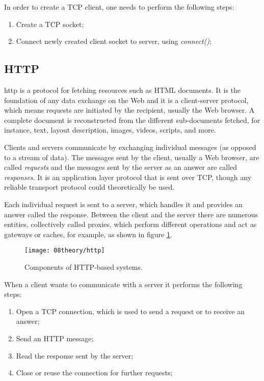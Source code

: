 
In order to create a TCP client, one needs to perform the following steps:
\begin{enumerate}
	\item Create a TCP socket;
	\item Connect newly created client socket to server, using \textit{connect()};
\end{enumerate}

\clearpage
\subsection{HTTP}
\ac{http} is a protocol for fetching resources such as HTML documents. It is the foundation of any data exchange on the Web and it is a client-server protocol, which means requests are initiated by the recipient, usually the Web browser. A complete document is reconstructed from the different sub-documents fetched, for instance, text, layout description, images, videos, scripts, and more. \cite{http}

Clients and servers communicate by exchanging individual messages (as opposed to a stream of data). The messages sent by the client, usually a Web browser, are called \textit{requests} and the messages sent by the server as an answer are called \textit{responses}. It is an application layer protocol that is sent over TCP, though any reliable transport protocol could theoretically be used. 

Each individual request is sent to a server, which handles it and provides an answer called the response. Between the client and the server there are numerous entities, collectively called proxies, which perform different operations and act as gateways or caches, for example, as shown in figure \ref{fig:http}.

\begin{figure}[H]
	\centering
	\texttt{[image: 08theory/http]}
	\caption{Components of HTTP-based systems.}
	\label{fig:http}
\end{figure}


When a client wants to communicate with a server it performs the following steps:
\begin{enumerate}
	\item Open a TCP connection, which is used to send a request or to receive an answer;
	\item Send an HTTP message;
	\item Read the response sent by the server;
	\item Close or reuse the connection for further requests;
\end{enumerate}

